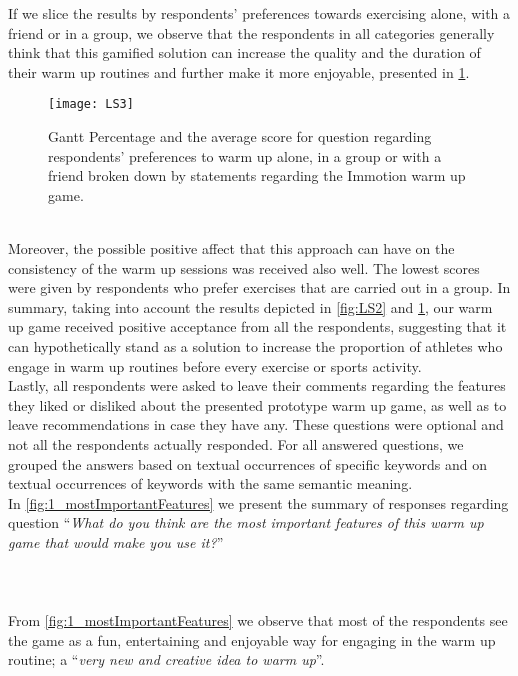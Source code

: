If we slice the results by respondents' preferences towards exercising alone, with a friend or in a group, we observe that the respondents in all categories generally think that this gamified solution can increase the quality and the duration of their warm up routines and further make it more enjoyable, presented in \ref{fig:LS3}.\\
\begin{figure}[h]
    \centering
    \texttt{[image: LS3]}
    \caption{Gantt Percentage and the average score for question regarding respondents' preferences to warm up alone, in a group or with a friend broken down by statements regarding the Immotion warm up game.}
    \label{fig:LS3}
\end{figure}\\ 
Moreover, the possible positive affect that this approach can have on the consistency of the warm up sessions was received also well. The lowest scores were given by respondents who prefer exercises that are carried out in a group. In summary, taking into account the results depicted in \ref{fig:LS2} and \ref{fig:LS3}, our warm up game received positive acceptance from all the respondents, suggesting that it can hypothetically stand as a solution to increase the proportion of athletes who engage in warm up routines before every exercise or sports activity.\\ Lastly, all respondents were asked to leave their comments regarding the features they liked or disliked about the presented prototype warm up game, as well as to leave recommendations in case they have any. These questions were optional and not all the respondents actually responded. For all answered questions, we grouped the answers based on textual occurrences of specific keywords and on textual occurrences of keywords with the same semantic meaning.\\ In \ref{fig:1_mostImportantFeatures} we present the summary of responses regarding question ``\textit{What do you think are the most important features of this warm up game that would make you use it?}''\\\\ \\ \\
From \ref{fig:1_mostImportantFeatures} we observe that most of the respondents see the game as a fun, entertaining and enjoyable way for engaging in the warm up routine; a ``\textit{very new and creative idea to warm up}''.
